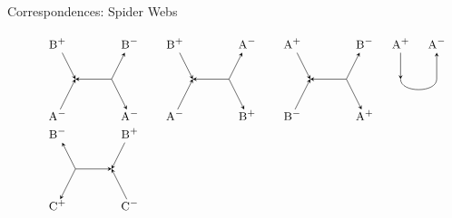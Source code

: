 \documentclass{beamer}
\begin{document}
\begin{frame}{Correspondences: Spider Webs}
\begin{figure}[h!]
\[\begin{tikzpicture}
			\node (i21) at (.5,-2.5) {$\textsc{\small B}^+$};
			\node (ii21) at (2.5,-2.5) {$\textsc{\small B}^-$};
			\node (d21) at (1,-3.5) {};
			\node (dd21) at (2,-3.5) {};
			\node (o21) at (.5,-4.5) {$\textsc{\small A}^-$};
			\node (oo21) at (2.5,-4.5) {$\textsc{\small A}^-$};
			\draw[->,>=stealth] (i21) -- (d21.center);
			\draw[<-,>=stealth] (ii21) -- (dd21.center);
			\draw[<-,>=stealth] (d21.center) -- (dd21.center);
			\draw[<-,>=stealth, shorten >=5pt] (d21.center) -- (o21.center);
			\draw[->,>=stealth, shorten >=5pt] (dd21.center) -- (oo21.center);
			
			\node (i22) at (3.75,-2.5) {$\textsc{\small B}^+$};
			\node (ii22) at (5.75,-2.5) {$\textsc{\small A}^-$};
			\node (d22) at (4.25,-3.5) {};
			\node (dd22) at (5.25,-3.5) {};
			\node (o22) at (3.75,-4.5) {$\textsc{\small A}^-$};
			\node (oo22) at (5.75,-4.5) {$\textsc{\small B}^+$};
			\draw[->,>=stealth] (i22) -- (d22.center);
			\draw[<-,>=stealth] (ii22) -- (dd22.center);
			\draw[<-,>=stealth] (d22.center) -- (dd22.center);
			\draw[<-,>=stealth, shorten >=5pt] (d22.center) -- (o22.center);
			\draw[->,>=stealth, shorten >=5pt] (dd22.center) -- (oo22.center);
			
			\node (i23) at (7,-2.5) {$\textsc{\small A}^+$};
			\node (ii23) at (9,-2.5) {$\textsc{\small B}^-$};
			\node (d23) at (7.5,-3.5) {};
			\node (dd23) at (8.5,-3.5) {};
			\node (o23) at (7,-4.5) {$\textsc{\small B}^-$};
			\node (oo23) at (9,-4.5) {$\textsc{\small A}^+$};
			\draw[->,>=stealth] (i23) -- (d23.center);
			\draw[<-,>=stealth] (ii23) -- (dd23.center);
			\draw[<-,>=stealth] (d23.center) -- (dd23.center);
			\draw[<-,>=stealth, shorten >=5pt] (d23.center) -- (o23.center);
			\draw[->,>=stealth, shorten >=5pt] (dd23.center) -- (oo23.center);
			
			\node (i24) at (10,-2.5) {$\textsc{\small A}^+$};
			\node (ii24) at (11,-2.5) {$\textsc{\small A}^-$};
			\node (d24) at (10,-3.5) {};
			\node (dd24) at (11,-3.5) {};
			\draw[->,>=stealth] (i24) -- (d24.center);
			\draw[<-,>=stealth] (ii24) -- (dd24.center);
			\draw (d24.center) edge [-,>=stealth,bend right=90] (dd24.center);
			
			\node (i31) at (.5,-5) {$\textsc{\small B}^-$};
			\node (ii31) at (2.5,-5) {$\textsc{\small B}^+$};
			\node (d31) at (1,-6) {};
			\node (dd31) at (2,-6) {};
			\node (o31) at (.5,-7) {$\textsc{\small C}^+$};
			\node (oo31) at (2.5,-7) {$\textsc{\small C}^-$};
			\draw[<-,>=stealth] (i31) -- (d31.center);
			\draw[->,>=stealth] (ii31) -- (dd31.center);
			\draw[->,>=stealth] (d31.center) -- (dd31.center);
			\draw[->,>=stealth, shorten >=5pt] (d31.center) -- (o31.center);
			\draw[<-,>=stealth, shorten >=5pt] (dd31.center) -- (oo31.center);
			

\end{tikzpicture}\]
\end{figure}
\end{frame}
\end{document}
